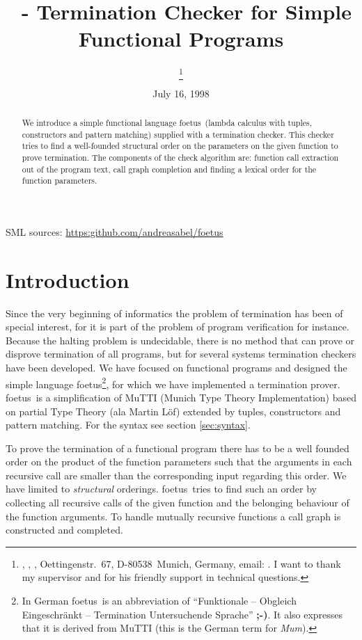 \documentclass[12pt,a4paper]{article}
\title{\foetus\ - Termination Checker for Simple Functional Programs}
\author{\htmladdnormallink{Andreas Abel}{\homepage}\thanks{
\htmladdnormallink{Theoretical Computer Science}{\tcs},
\htmladdnormallink{Institute of Computer Science}{\informatik},
\htmladdnormallink{Ludwigs-Maxi\-mi\-lians-University}{\lmu},
Oettingenstr.~67, D-80538~Munich, Germany,
email: \htmladdnormallink{{\tt \myemail}}{mailto:\myemail}.
I want to thank my supervisor \htmladdnormallink{Thorsten
  Altenkirch}{\tcsroot/~alti/} and \htmladdnormallink{Rolf
  Backofen}{\tcsroot/~backofen/} for his friendly support in technical
questions.
}}
\date{July 16, 1998}
\newcommand{\foetus}{{\sf foetus}}
\newcommand{\tcsroot}{https://www2.tcs.ifi.lmu.de}
\newcommand{\cgi}{\tcsroot/cgi-bin/foetus-cgi}
\newcommand{\htmllink}[2]{\html{\htmladdnormallink{#1}{#2}}}
\newcommand{\linktocgi}[1]{\htmllink{#1}{\cgi}}
\newcommand{\download}{SML sources: \url{https:github.com/andreasabel/foetus}}
\begin{document}
\maketitle


\begin{abstract}
We introduce a simple functional language \foetus\ (lambda calculus with
tuples, constructors and pattern matching) supplied with a termination
checker.
This checker tries to find a well-founded structural order on the
parameters on the given function to prove termination.
The components of the check algorithm are: function call extraction
out of the program text, call graph completion and finding a lexical
order for the function parameters.
\end{abstract}


\download

\section{Introduction}
Since the very beginning of informatics the problem of termination has
been of special interest, for it is part of the problem of program
verification for instance. Because the halting problem is
undecidable, there is no method that can prove or disprove termination
of all programs, but for several systems termination checkers have been
developed. We have focused on functional programs and designed the
simple language \foetus\footnote{In German \foetus\ is an abbreviation
  of ``Funktionale -- Obgleich Eingeschr\"ankt -- Termination
  Untersuchende Sprache'' {\bf ;-)}. It also expresses that it is
  derived from MuTTI (this is the German term for {\it Mum}).},
for which we have implemented a termination
prover. \foetus\ is a simplification of MuTTI (Munich Type Theory
Implementation) based on %
partial Type Theory (ala Martin L\"of) extended by tuples,
constructors and pattern matching. For the syntax see section
\ref{sec:syntax}.

To prove the termination of a functional program there has to be a
well founded order on the product of the function parameters
such that the arguments in each recursive call
are smaller than the corresponding input regarding this order.
We have limited to {\em structural} orderings.
\foetus\ tries to find such
an order by collecting all recursive calls of the given function and
the belonging behaviour of the function arguments. To handle mutually
recursive functions a call graph is constructed and completed.
\end{document}
